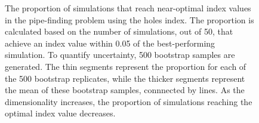 \documentclass[
  12pt,
]{interact}
\theoremstyle{plain}
\begin{document}
\begin{figure}


\caption{\label{fig-proportion}The proportion of simulations that reach
near-optimal index values in the pipe-finding problem using the holes
index. The proportion is calculated based on the number of simulations,
out of 50, that achieve an index value within 0.05 of the
best-performing simulation. To quantify uncertainty, 500 bootstrap
samples are generated. The thin segments represent the proportion for
each of the 500 bootstrap replicates, while the thicker segments
represent the mean of these bootstrap samples, connnected by lines. As
the dimensionality increases, the proportion of simulations reaching the
optimal index value decreases.}

\end{figure}%
\end{document}
